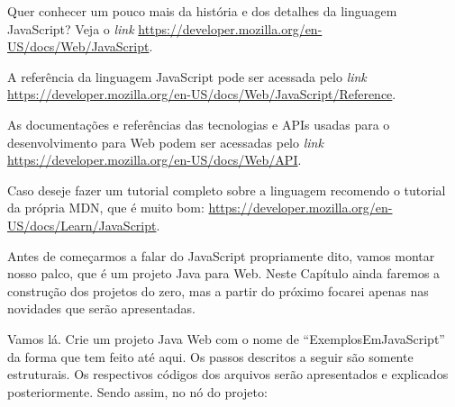 \begin{saibaMais}
    Quer conhecer um pouco mais da história e dos detalhes da linguagem JavaScript? Veja o \textit{link} \url{https://developer.mozilla.org/en-US/docs/Web/JavaScript}.
\end{saibaMais}

\begin{saibaMais}
    A referência da linguagem JavaScript pode ser acessada pelo \textit{link} \url{https://developer.mozilla.org/en-US/docs/Web/JavaScript/Reference}.
\end{saibaMais}

\begin{saibaMais}
    As documentações e referências das tecnologias e APIs usadas para o desenvolvimento para Web podem ser acessadas pelo \textit{link} \url{https://developer.mozilla.org/en-US/docs/Web/API}.
\end{saibaMais}

\begin{saibaMais}
    Caso deseje fazer um tutorial completo sobre a linguagem recomendo o tutorial da própria MDN, que é muito bom: \url{https://developer.mozilla.org/en-US/docs/Learn/JavaScript}.
\end{saibaMais}


Antes de começarmos a falar do JavaScript propriamente dito, vamos montar nosso palco, que é um projeto Java para Web. Neste Capítulo ainda faremos a construção dos projetos do zero, mas a partir do próximo focarei apenas nas novidades que serão apresentadas.

Vamos lá. Crie um projeto Java Web com o nome de ``ExemplosEmJavaScript'' da forma que tem feito até aqui. Os passos descritos a seguir são somente estruturais. Os respectivos códigos dos arquivos serão apresentados e explicados posteriormente. Sendo assim, no nó  do projeto:

